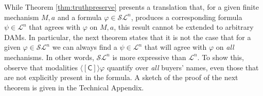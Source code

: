 \documentclass[letterpaper]{article} %
\theoremstyle{definition}
\newtheorem{theorem}{Theorem}
\begin{document}
While Theorem \ref{thm:truthpreserve} presents a translation that, for a given finite mechanism $M,a$ and a formula $\varphi \in \mathcal{SL}^n$, produces a corresponding formula $\psi \in \mathcal{L}^n$ that agrees with $\varphi$ on $M,a$, this result cannot be extended to arbitrary DAMs. In particular, the next theorem states that it is not the case that for a given $\varphi \in \mathcal{SL}^n$ we can always find a $\psi \in \mathcal{L}^n$ that will agree with $\varphi$ on \textit{all} mechanisms. In other words, $\mathcal{SL}^n$ is more expressive than $\mathcal{L}^n$. To show this, observe that modalities $\langle \! [ \mathsf{C} ] \! \rangle \varphi$ quantify over \textit{all} buyers' names, even those that are not explicitly present in the formula. A sketch of the proof of the next theorem is given in the Technical Appendix. 

 
 
\end{document}
